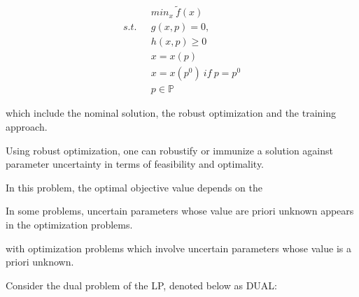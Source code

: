 \begin{equation}
	\begin{aligned}
		\  \  \ & min_{x} \  \tilde f(x) \\
		s.t.  \  \  \ & g(x, p) = 0, \\ 
		&  h(x,p)  \geq  0  \\ 
		& x = x(p) \\
		& x = x(p^0) \  if \  p = p^0 \\
		& p \in \mathbb{P}		
	\end{aligned}
\end{equation}







which include the nominal solution, the robust optimization and the training approach. 


Using robust optimization, one can robustify or immunize a solution against parameter uncertainty in terms
of feasibility and optimality.






In this problem, the optimal objective value depends on the 







In some problems, uncertain parameters whose value are priori unknown appears in the optimization problems. 



with optimization problems which involve uncertain parameters whose value is a priori unknown. 

Consider the dual problem of the LP, denoted below as DUAL: 








